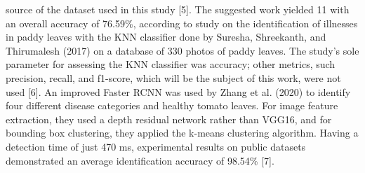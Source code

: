 source of the dataset used in this study [5]. The suggested work yielded 11 with an overall accuracy of 76.59\%, according to study on the identification of illnesses in paddy leaves with the KNN classifier done by Suresha, Shreekanth, and Thirumalesh (2017) on a database of 330 photos of paddy leaves. The study's sole parameter for assessing the KNN classifier was accuracy; other metrics, such precision, recall, and f1-score, which will be the subject of this work, were not used [6]. An improved Faster RCNN was used by Zhang et al. (2020) to identify four different disease categories and healthy tomato leaves. For image feature extraction, they used a depth residual network rather than VGG16, and for bounding box clustering, they applied the k-means clustering algorithm. Having a detection time of just 470 ms, experimental results on public datasets demonstrated an average identification accuracy of 98.54\% [7].
